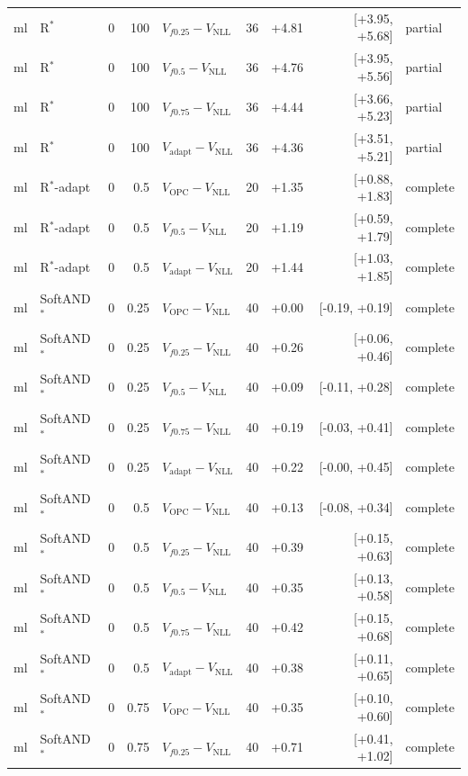 \documentclass[10pt,a4paper]{article}
\begin{document}
{\begin{longtable}{llrrlrrrl}
ml & R$^*$ & 0 & 100 & $V_{f0.25}-V_{\mathrm{NLL}}$ & 36 & +4.81 & [+3.95, +5.68] & partial \\
ml & R$^*$ & 0 & 100 & $V_{f0.5}-V_{\mathrm{NLL}}$ & 36 & +4.76 & [+3.95, +5.56] & partial \\
ml & R$^*$ & 0 & 100 & $V_{f0.75}-V_{\mathrm{NLL}}$ & 36 & +4.44 & [+3.66, +5.23] & partial \\
ml & R$^*$ & 0 & 100 & $V_{\mathrm{adapt}}-V_{\mathrm{NLL}}$ & 36 & +4.36 & [+3.51, +5.21] & partial \\
ml & R$^*$-adapt & 0 & 0.5 & $V_{\mathrm{OPC}}-V_{\mathrm{NLL}}$ & 20 & +1.35 & [+0.88, +1.83] & complete \\
ml & R$^*$-adapt & 0 & 0.5 & $V_{f0.5}-V_{\mathrm{NLL}}$ & 20 & +1.19 & [+0.59, +1.79] & complete \\
ml & R$^*$-adapt & 0 & 0.5 & $V_{\mathrm{adapt}}-V_{\mathrm{NLL}}$ & 20 & +1.44 & [+1.03, +1.85] & complete \\
ml & SoftAND$^*$ & 0 & 0.25 & $V_{\mathrm{OPC}}-V_{\mathrm{NLL}}$ & 40 & +0.00 & [-0.19, +0.19] & complete \\
ml & SoftAND$^*$ & 0 & 0.25 & $V_{f0.25}-V_{\mathrm{NLL}}$ & 40 & +0.26 & [+0.06, +0.46] & complete \\
ml & SoftAND$^*$ & 0 & 0.25 & $V_{f0.5}-V_{\mathrm{NLL}}$ & 40 & +0.09 & [-0.11, +0.28] & complete \\
ml & SoftAND$^*$ & 0 & 0.25 & $V_{f0.75}-V_{\mathrm{NLL}}$ & 40 & +0.19 & [-0.03, +0.41] & complete \\
ml & SoftAND$^*$ & 0 & 0.25 & $V_{\mathrm{adapt}}-V_{\mathrm{NLL}}$ & 40 & +0.22 & [-0.00, +0.45] & complete \\
ml & SoftAND$^*$ & 0 & 0.5 & $V_{\mathrm{OPC}}-V_{\mathrm{NLL}}$ & 40 & +0.13 & [-0.08, +0.34] & complete \\
ml & SoftAND$^*$ & 0 & 0.5 & $V_{f0.25}-V_{\mathrm{NLL}}$ & 40 & +0.39 & [+0.15, +0.63] & complete \\
ml & SoftAND$^*$ & 0 & 0.5 & $V_{f0.5}-V_{\mathrm{NLL}}$ & 40 & +0.35 & [+0.13, +0.58] & complete \\
ml & SoftAND$^*$ & 0 & 0.5 & $V_{f0.75}-V_{\mathrm{NLL}}$ & 40 & +0.42 & [+0.15, +0.68] & complete \\
ml & SoftAND$^*$ & 0 & 0.5 & $V_{\mathrm{adapt}}-V_{\mathrm{NLL}}$ & 40 & +0.38 & [+0.11, +0.65] & complete \\
ml & SoftAND$^*$ & 0 & 0.75 & $V_{\mathrm{OPC}}-V_{\mathrm{NLL}}$ & 40 & +0.35 & [+0.10, +0.60] & complete \\
ml & SoftAND$^*$ & 0 & 0.75 & $V_{f0.25}-V_{\mathrm{NLL}}$ & 40 & +0.71 & [+0.41, +1.02] & complete \\

\end{longtable}}
\end{document}
